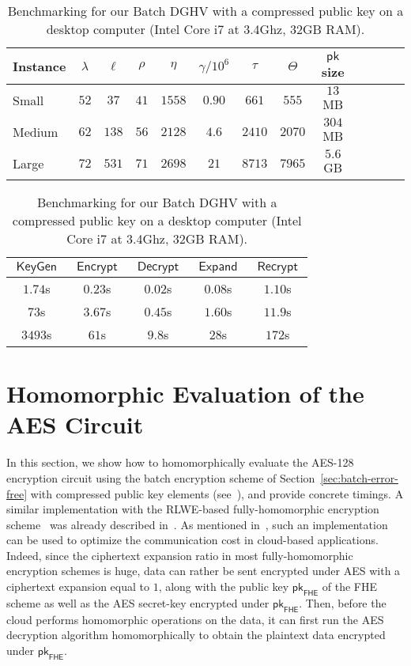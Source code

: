 \documentclass{llncs}
\DeclareMathOperator{\KeyGen}{\ensuremath{\mathsf{KeyGen}}}
\DeclareMathOperator{\Expand}{\ensuremath{\mathsf{Expand}}}
\DeclareMathOperator{\Encrypt}{\ensuremath{\mathsf{Encrypt}}}
\DeclareMathOperator{\Decrypt}{\ensuremath{\mathsf{Decrypt}}}
\DeclareMathOperator{\Recrypt}{\ensuremath{\mathsf{Recrypt}}}
\DeclareMathOperator{\Mult}{\ensuremath{\mathsf{Mult}}}
\newcommand*{\pk}{\ensuremath{\mathsf{pk}}}
\newcommand*{\FHE}{\ensuremath{\mathsf{FHE}}}
\begin{document}
\begin{table}[h]\scriptsize\centering
\begin{tabular}{|l|c|c||c|c|c|c|c|c|c|c|c||r|}
\hline 
\textbf{Instance}&$\lambda$&$\ell$&$\rho$&$\eta$&$\gamma/ 10^{6}$&$\tau$&$\Theta$&$\pk$ size\\
\hline
\hline
Small&$52$&$37$&$41$&$1558$&$0.90$&$661$&$555$&$13$ MB\\\hline
Medium&$62$&$138$&$56$&$2128$&$4.6$&$2410$&$2070$&$304$ MB\\\hline
Large&$72$&$531$&$71$&$2698$&$21$&$8713$&$7965$&$5.6$ GB\\\hline
\end{tabular}\begin{tabular}{||c|c|c|c|c|}
\hline 
$\KeyGen$&$\Encrypt$&$\Decrypt$&
$\Expand$ & $\Recrypt$\\
\hline
\hline
$1.74$s&$0.23$s&$0.02$s&
$0.08$s&$1.10$s\\\hline
$73$s&$3.67$s&$0.45$s&
$1.60$s&$11.9$s\\\hline
$3493$s&$61$s&$9.8$s&
$28$s&$172$s\\\hline
\end{tabular}
\smallskip
\caption{Benchmarking for our Batch DGHV with a compressed public key
  on a desktop computer (Intel Core i7 at 3.4Ghz, 32GB RAM).}
\label{t:concparams}
\end{table}


\section{Homomorphic Evaluation of the AES Circuit}
\label{sec:HAES}

In this section, we show how to homomorphically evaluate the AES-128
encryption circuit using the batch encryption scheme of Section~\ref{sec:batch-error-free} with compressed public key elements (see~\cite{CLT2013a}), and provide
concrete timings. A similar
implementation with
 the RLWE-based 
fully-homomorphic encryption scheme~\cite{BV2011a,BV2011b,GHS2012a}
was already described in~\cite{GHS2012c}. 
As mentioned 
in~\cite{SV2011,NLV2011,GHS2012c}, such an implementation can be used to
optimize the communication cost in cloud-based
applications. Indeed, since the ciphertext expansion ratio in most
fully-homomorphic encryption schemes is huge, data can rather be sent
encrypted under AES with a ciphertext expansion equal to $1$, along
with the public key $\pk_{\FHE}$ of the FHE scheme as well as
the AES secret-key 
encrypted under $\pk_{\FHE}$. Then, before the cloud performs homomorphic operations
on the data, it can first run the AES decryption algorithm
homomorphically to obtain the plaintext data encrypted under
$\pk_{\FHE}$.
\end{document}
